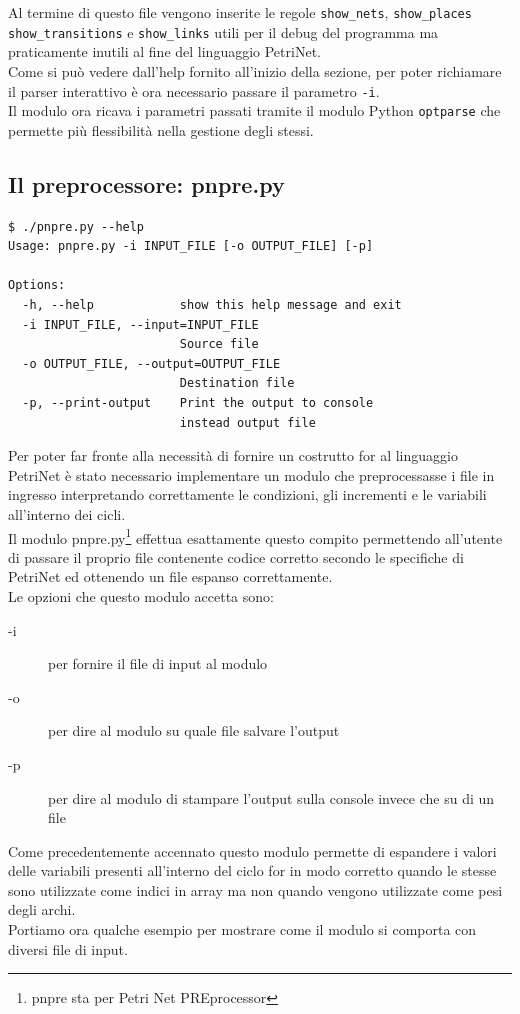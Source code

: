 \documentclass[italian,12pt]{book}
\begin{document}
Al termine di questo file vengono inserite le regole {\tt show\_nets}, {\tt show\_places} {\tt show\_transitions} e {\tt show\_links} utili per il debug del programma ma praticamente inutili al fine del linguaggio PetriNet.\\
Come si può vedere dall'help fornito all'inizio della sezione, per poter
richiamare il parser interattivo è ora necessario passare il parametro {\tt -i}.\\
Il modulo ora ricava i parametri passati tramite il modulo Python {\tt optparse} che 
permette più flessibilità nella gestione degli stessi.

\subsection{Il preprocessore: pnpre.py}
\begin{verbatim}
$ ./pnpre.py --help
Usage: pnpre.py -i INPUT_FILE [-o OUTPUT_FILE] [-p]

Options:
  -h, --help            show this help message and exit
  -i INPUT_FILE, --input=INPUT_FILE
                        Source file
  -o OUTPUT_FILE, --output=OUTPUT_FILE
                        Destination file
  -p, --print-output    Print the output to console 
                        instead output file
\end{verbatim}
Per poter far fronte alla necessità di fornire un costrutto for al
linguaggio PetriNet è stato necessario implementare un modulo che 
preprocessasse i file in ingresso interpretando correttamente le
condizioni, gli incrementi e le variabili all'interno dei cicli.\\
Il modulo pnpre.py\footnote{pnpre sta per Petri Net PREprocessor} 
effettua esattamente questo compito permettendo
all'utente di passare il proprio file contenente codice corretto
secondo le specifiche di PetriNet ed ottenendo un file espanso
correttamente. \\
Le opzioni che questo modulo accetta sono:
\begin{description}
\item[-i] per fornire il file
di input al modulo
\item[-o] per dire al modulo su quale file salvare l'output
\item[-p] per dire al modulo di stampare l'output sulla console
  invece che su di un file
\end{description}
Come precedentemente accennato questo modulo permette di espandere i
valori delle variabili presenti all'interno del ciclo for in modo
corretto quando le stesse sono utilizzate come indici in array ma non
quando vengono utilizzate come pesi degli archi. \\
Portiamo ora qualche esempio per mostrare come il modulo si comporta
con diversi file di input.
\end{document}
